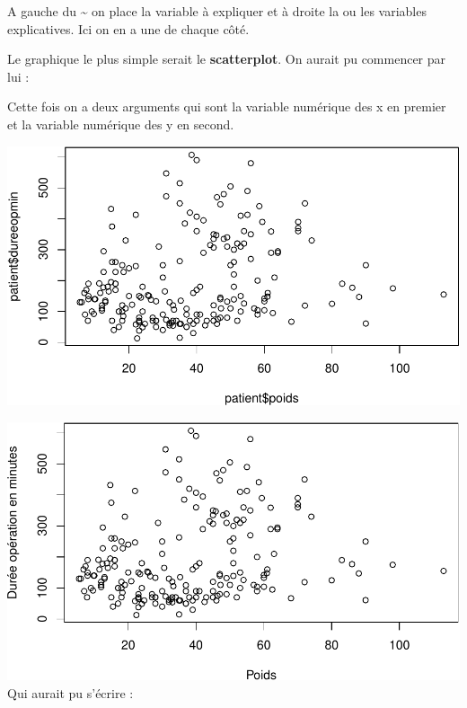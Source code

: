 \documentclass[
]{book}
\newenvironment{Shaded}{\begin{snugshade}}{\end{snugshade}}
\newcommand{\AttributeTok}[1]{\textcolor[rgb]{0.13,0.29,0.53}{#1}}
\newcommand{\FunctionTok}[1]{\textcolor[rgb]{0.13,0.29,0.53}{\textbf{#1}}}
\newcommand{\NormalTok}[1]{#1}
\newcommand{\SpecialCharTok}[1]{\textcolor[rgb]{0.81,0.36,0.00}{\textbf{#1}}}
\newcommand{\StringTok}[1]{\textcolor[rgb]{0.31,0.60,0.02}{#1}}
\begin{document}
A gauche du \textasciitilde{} on place la variable à expliquer et à droite la ou les variables
explicatives. Ici on en a une de chaque côté.

Le graphique le plus simple serait le \textbf{scatterplot}. On aurait pu commencer
par lui :

Cette fois on a deux arguments qui sont la variable numérique des x en premier
et la variable numérique des y en second.

\begin{Shaded}
\end{Shaded}

\includegraphics{_main_files/figure-latex/poids7-1.pdf}

\begin{Shaded}
\end{Shaded}

\includegraphics{_main_files/figure-latex/poids8-1.pdf}
Qui aurait pu s'écrire :
\end{document}
